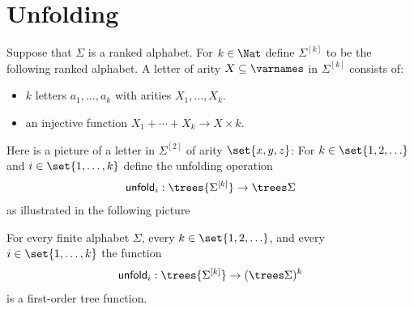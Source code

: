 \section{Unfolding}

Suppose that $\Sigma$ is a ranked alphabet. For $k \in \Nat$ define $\Sigma^{[k]}$ to be the following ranked alphabet. A letter of arity $X \subseteq \varnames$ in $\Sigma^{[k]}$ consists of:
\begin{itemize}
    \item $k$ letters $a_1,\ldots,a_k$ with arities $X_1,\ldots,X_k$.
    \item an injective function $X_1 + \cdots + X_k \to X \times k$.
\end{itemize}
Here is a picture of a letter in $\Sigma^{[2]}$ of arity $\set{x,y,z}$:
For $k \in \set{1,2,\ldots}$ and $i \in \set{1,\ldots,k}$ define 
 the unfolding operation 
\begin{align*}
    \mathsf{unfold}_i : \trees {\Sigma^{[k]}} \to \trees \Sigma
\end{align*}
as illustrated in the following picture
 

\begin{lemma}\label{lem:unfold}
    For every finite alphabet $\Sigma$, every $k \in \set{1,2,\ldots}$, and every $i \in \set{1,\ldots,k}$ the function
    \begin{align*}
        \mathsf{unfold}_i : \trees {\Sigma^{[k]}} \to (\trees \Sigma)^k
    \end{align*}    
     is a first-order tree function.
\end{lemma}